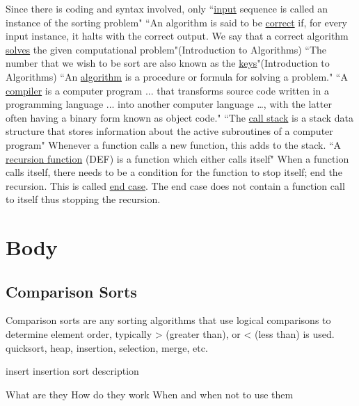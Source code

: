 \documentclass[12pt]{article}
\begin{document}
	Since there is coding and syntax involved, only 
	``\underline{input} sequence is called an instance of the sorting problem"\cite[p.~5]{intro}\newline
	``An algorithm is said to be \underline{correct} if, for every input instance, it halts with the correct output. We say that a correct algorithm \underline{solves} the given computational problem"(Introduction to Algorithms)\cite[p.~6]{intro}\newline
	``The number that we wish to be sort are also known as the \underline{keys}"(Introduction to Algorithms)\cite[p.~16]{intro}\newline
	``An \underline{algorithm} is a procedure or formula for solving a problem."\cite{wiki}\newline
	``A \underline{compiler} is a computer program ... that transforms source code written in a programming language ... into another computer language …, with the latter often having a binary form known as object code."\cite{wiki}\newline
	``The \underline{call stack} is a stack data structure that stores information about the active subroutines of a computer program"\cite{wiki} Whenever a function calls a new function, this adds to the stack.\newline
	``A \underline{recursion function} (DEF) is a function which either calls itself"\cite{wiki} When a function calls itself, there needs to be a condition for the function to stop itself; end the recursion. This is called \underline{end case}. The end case does not contain a function call to itself thus stopping the recursion.\newline
	
	\section{Body}
	
	\subsection{Comparison Sorts}
	Comparison sorts are any sorting algorithms that use logical comparisons to determine element order, typically > (greater than), or < (less than)  is used.
	quicksort, heap, insertion, selection, merge, etc.
	
	insert insertion sort description
	
	What are they
	How do they work
	When and when not to use them
	
	
	
\end{document}
